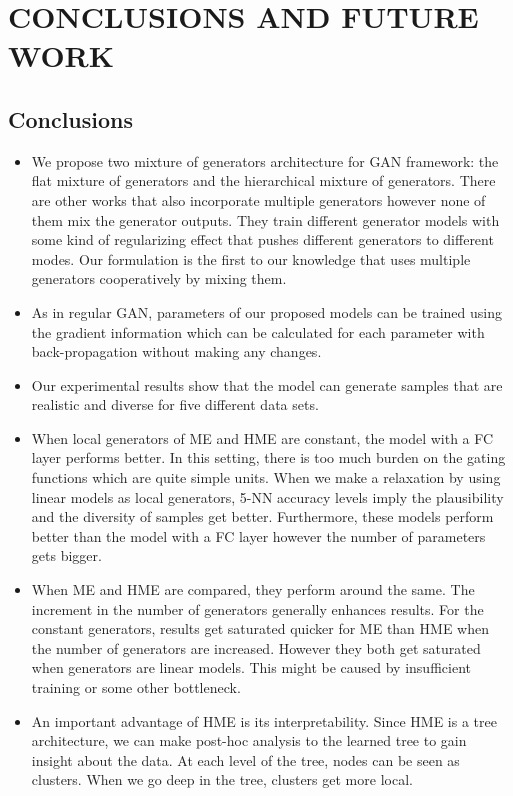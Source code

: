 \documentclass[a4paper,onesided,12pt]{report}
\begin{document}
\chapter{CONCLUSIONS AND FUTURE WORK}
\label{chapter:conc}

\section{Conclusions}
\label{sec:conc}
\begin{itemize}
\item We propose two mixture of generators architecture for GAN framework: the flat mixture of generators and the hierarchical mixture of generators. There are other works that also incorporate multiple generators however none of them mix the generator outputs. They train different generator models with some kind of regularizing effect that pushes different generators to different modes. Our formulation is the first to our knowledge that uses multiple generators cooperatively by mixing them. 
\item As in regular GAN, parameters of our proposed models can be trained using the gradient information which can be calculated for each parameter with back-propagation without making any changes.
\item Our experimental results show that the model can generate samples that are realistic and diverse for five different data sets.
\item When local generators of ME and HME are constant, the model with a FC layer performs better. In this setting, there is too much burden on the gating functions which are quite simple units. When we make a relaxation by using linear models as local generators, 5-NN accuracy levels imply the plausibility and the diversity of samples get better. Furthermore, these models perform better than the model with a FC layer however the number of parameters gets bigger.
\item When ME and HME are compared, they perform around the same. The increment in the number of generators generally enhances results. For the constant generators, results get saturated quicker for ME than HME when the number of generators are increased. However they both get saturated when generators are linear models. This might be caused by insufficient training or some other bottleneck.
\item An important advantage of HME is its interpretability. Since HME is a tree architecture, we can make post-hoc analysis to the learned tree to gain insight about the data. At each level of the tree, nodes can be seen as clusters. When we go deep in the tree, clusters get more local.
\end{itemize}
\end{document}
